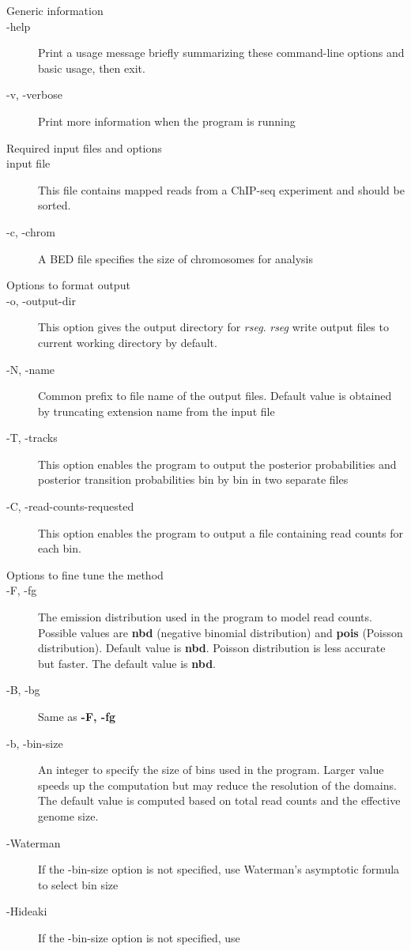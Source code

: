 \documentclass[11pt]{report}
\begin{document}
\begin{description}
\item[Generic information]
\item[-help] Print a usage message briefly summarizing these
  command-line options and basic usage, then exit.
\item[-v, -verbose] Print more information when the program is running
\item[Required input files and options]
\item[input file] This file contains mapped reads from a
  ChIP-seq experiment and should be sorted.
\item[-c, -chrom] A BED file specifies the size of chromosomes for
  analysis
\item[Options to format output]
\item[-o, -output-dir] This option gives the output directory for
  \textit{rseg}. \textit{rseg} write output files to current working
  directory by default.
\item[-N, -name] Common prefix to file name of the output
  files. Default value is obtained by truncating extension name from
the input file
\item[-T, -tracks] This option enables the program to output the
  posterior probabilities and posterior transition probabilities bin
  by bin in two separate files
\item[-C, -read-counts-requested] This option enables the program to
  output a file containing read counts for each bin.  
\item[Options to fine tune the method]
\item[-F, -fg] The emission distribution used in the program to model
  read counts. Possible values are \textbf{nbd} (negative binomial
  distribution) and \textbf{pois} (Poisson distribution). Default
  value is \textbf{nbd}. Poisson distribution is less accurate but
  faster.  The default value is \textbf{nbd}.
\item[-B, -bg] Same as \textbf{-F, -fg} 
\item[-b, -bin-size] An integer to specify the size of bins used in
  the program. Larger value speeds up the computation but may reduce
  the resolution of the domains. The default value is computed based
  on total read counts and the effective genome size.
\item[-Waterman] If the -bin-size option is not specified, use
  Waterman's asymptotic formula to select bin size
\item[-Hideaki] If the -bin-size option is not specified, use

\end{description}
\end{document}
